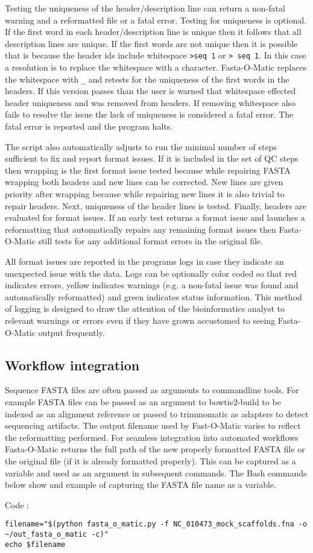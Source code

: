 Testing the uniqueness of the header/description line can return a non-fatal warning and a reformatted file or a fatal error. Testing for uniqueness is optional. If the first word in each header/description line is unique then it follows that all description lines are unique. If the first words are not unique then it is possible that is because the header ids include whitespace \verb|>seq 1| or \verb|> seq 1|. In this case a resolution is to replace the whitespace with a character. Fasta-O-Matic replaces the whitespace with \verb|_| and retests for the uniqueness of the first words in the headers. If this version passes than the user is warned that whitespace effected header uniqueness and was removed from headers. If removing whitespace also fails to resolve the issue the lack of uniqueness is considered a fatal error. The fatal error is reported and the program halts.

The script also automatically adjusts to run the minimal number of steps sufficient to fix and report format issues. If it is included in the set of QC steps then wrapping is the first format issue tested because while repairing FASTA wrapping both headers and new lines can be corrected. New lines are given priority after wrapping because while repairing new lines it is also trivial to repair headers. Next, uniqueness of the header lines is tested. Finally, headers are evaluated for format issues. If an early test returns a format issue and launches a reformatting that automatically repairs any remaining format issues then Fasta-O-Matic still tests for any additional format errors in the original file. 

All format issues are reported in the programs logs in case they indicate an unexpected issue with the data. Logs can be optionally color coded so that red indicates errors, yellow indicates warnings (e.g. a non-fatal issue was found and automatically reformatted) and green indicates status information. This method of logging is designed to draw the attention of the bioinformatics analyst to relevant warnings or errors even if they have grown accustomed to seeing Fasta-O-Matic output frequently.
  
\subsection{Workflow integration}
 
Sequence FASTA files are often passed as arguments to commandline tools. For example FASTA files can be passed as an argument to bowtie2-build to be indexed as an alignment reference \cite{langmead2012fast} or passed to trimmomatic as adapters to detect sequencing artifacts. The output filename used by Fast-O-Matic varies to reflect the reformatting performed. For seamless integration into automated workflows Fasta-O-Matic returns the full path of the new properly formatted FASTA file or the original file (if it is already formatted properly). This can be captured as a variable and used as an argument in subsequent commands. The Bash commands below show and example of capturing the FASTA file name as a variable.

Code :
\begin{verbatim}
filename="$(python fasta_o_matic.py -f NC_010473_mock_scaffolds.fna -o ~/out_fasta_o_matic -c)"
echo $filename
\end{verbatim}
  
  
  
  
  